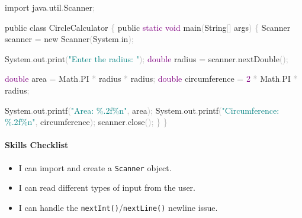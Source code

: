 \documentclass[
  justified,
  openright,
]{tufte-book}
\let\subsubsection\paragraph
\let\paragraph\paragraph
\newcommand{\BuiltInTok}[1]{#1}
\newcommand{\DataTypeTok}[1]{\textcolor{Purple}{#1}}
\newcommand{\DecValTok}[1]{\textcolor{Purple}{#1}}
\newcommand{\FunctionTok}[1]{\textcolor{BrandBlue}{#1}}
\newcommand{\ImportTok}[1]{\textcolor{BrandAccent}{#1}}
\newcommand{\KeywordTok}[1]{\textcolor{BrandBlue}{#1}}
\newcommand{\NormalTok}[1]{#1}
\newcommand{\OperatorTok}[1]{\textcolor{DarkGray}{#1}}
\newcommand{\SpecialCharTok}[1]{\textcolor{Teal}{#1}}
\newcommand{\StringTok}[1]{\textcolor{Teal}{#1}}
\newenvironment{Shaded}{%
  \begin{snugshade}
}{%
  \end{snugshade}
}
\let\subsubsection\paragraph
\let\paragraph\paragraph
\providecommand{\tightlist}{%
  \setlength{\itemsep}{0pt}\setlength{\parskip}{0pt}}
\begin{document}
\begin{Shaded}
\begin{Highlighting}[]
\KeywordTok{import} \ImportTok{java}\OperatorTok{.}\ImportTok{util}\OperatorTok{.}\ImportTok{Scanner}\OperatorTok{;}

\KeywordTok{public} \KeywordTok{class}\NormalTok{ CircleCalculator }\OperatorTok{\{}
    \KeywordTok{public} \DataTypeTok{static} \DataTypeTok{void} \FunctionTok{main}\OperatorTok{(}\BuiltInTok{String}\OperatorTok{[]}\NormalTok{ args}\OperatorTok{)} \OperatorTok{\{}
        \BuiltInTok{Scanner}\NormalTok{ scanner }\OperatorTok{=} \KeywordTok{new} \BuiltInTok{Scanner}\OperatorTok{(}\BuiltInTok{System}\OperatorTok{.}\FunctionTok{in}\OperatorTok{);}

        \BuiltInTok{System}\OperatorTok{.}\FunctionTok{out}\OperatorTok{.}\FunctionTok{print}\OperatorTok{(}\StringTok{"Enter the radius: "}\OperatorTok{);}
        \DataTypeTok{double}\NormalTok{ radius }\OperatorTok{=}\NormalTok{ scanner}\OperatorTok{.}\FunctionTok{nextDouble}\OperatorTok{();}

        \DataTypeTok{double}\NormalTok{ area }\OperatorTok{=} \BuiltInTok{Math}\OperatorTok{.}\FunctionTok{PI} \OperatorTok{*}\NormalTok{ radius }\OperatorTok{*}\NormalTok{ radius}\OperatorTok{;}
        \DataTypeTok{double}\NormalTok{ circumference }\OperatorTok{=} \DecValTok{2} \OperatorTok{*} \BuiltInTok{Math}\OperatorTok{.}\FunctionTok{PI} \OperatorTok{*}\NormalTok{ radius}\OperatorTok{;}

        \BuiltInTok{System}\OperatorTok{.}\FunctionTok{out}\OperatorTok{.}\FunctionTok{printf}\OperatorTok{(}\StringTok{"Area: }\SpecialCharTok{\%.2f\%n}\StringTok{"}\OperatorTok{,}\NormalTok{ area}\OperatorTok{);}
        \BuiltInTok{System}\OperatorTok{.}\FunctionTok{out}\OperatorTok{.}\FunctionTok{printf}\OperatorTok{(}\StringTok{"Circumference: }\SpecialCharTok{\%.2f\%n}\StringTok{"}\OperatorTok{,}\NormalTok{ circumference}\OperatorTok{);}
\NormalTok{        scanner}\OperatorTok{.}\FunctionTok{close}\OperatorTok{();}
    \OperatorTok{\}}
\OperatorTok{\}}
\end{Highlighting}
\end{Shaded}

\subsubsection{Skills Checklist}\label{skills-checklist-5}

\begin{itemize}
\tightlist
\item[$\square$]
  I can import and create a \texttt{Scanner} object.
\item[$\square$]
  I can read different types of input from the user.
\item[$\square$]
  I can handle the \texttt{nextInt()}/\texttt{nextLine()} newline issue.
\end{itemize}
\end{document}
